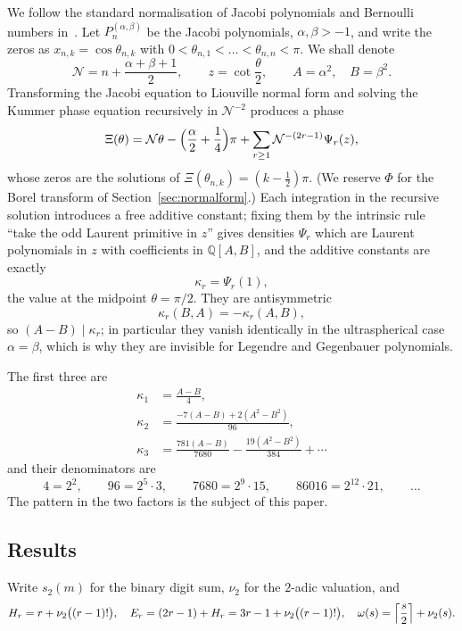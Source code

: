 \documentclass[12pt]{amsart}
\theoremstyle{definition}
\theoremstyle{remark}
\newcommand{\Nn}{\mathcal N}
\begin{document}
We follow the standard normalisation of Jacobi polynomials and Bernoulli numbers in~\cite{Szego,DLMF}.  Let $P_n^{(\alpha,\beta)}$ be the Jacobi polynomials, $\alpha,\beta>-1$, and write the zeros as $x_{n,k}=\cos\theta_{n,k}$ with $0<\theta_{n,1}<\dots<\theta_{n,n}<\pi$. We shall denote
\[
  \Nn=n+\frac{\alpha+\beta+1}2,\qquad z=\cot\frac\theta2,\qquad   A=\alpha^2,\quad B=\beta^2 .
\]
Transforming the Jacobi equation to Liouville normal form and solving the Kummer phase equation recursively in $\Nn^{-2}$ produces a phase
\begin{equation}\label{eq:phase}
  \Xi(\theta)=\Nn\theta-\Bigl(\frac\alpha2+\frac14\Bigr)\pi   +\sum_{r\ge1}\Nn^{-(2r-1)}\Psi_r(z),
\end{equation}
whose zeros are the solutions of $\Xi(\theta_{n,k})=(k-\frac12)\pi$.  (We reserve $\Phi$ for the Borel transform of Section~\ref{sec:normalform}.)  Each integration in the recursive solution introduces a free additive constant; fixing them by the intrinsic rule ``take the odd Laurent primitive in $z$'' gives densities $\Psi_r$ which are Laurent polynomials in $z$ with coefficients in $\mathbb Q[A,B]$, and the additive constants are exactly
\[
  \kappa_r=\Psi_r(1),
\]
the value at the midpoint $\theta=\pi/2$.  They are antisymmetric
\[
\kappa_r(B,A)=-\kappa_r(A,B), 
\]
so $(A-B)\mid\kappa_r$; in particular they vanish identically in the ultraspherical case $\alpha=\beta$, which is why they are invisible for Legendre and Gegenbauer polynomials.

The first three are
\begin{align*}
  \kappa_1&=\frac{A-B}4,\\
  \kappa_2&=\frac{-7(A-B)+2(A^2-B^2)}{96},\\
  \kappa_3&=\frac{781(A-B)}{7680}-\frac{19(A^2-B^2)}{384}+\cdots
\end{align*}
and their denominators are
\[
  4=2^2,\qquad 96=2^5\!\cdot\!3,\qquad 7680=2^9\!\cdot\!15,\qquad   86016=2^{12}\!\cdot\!21,\qquad\dots
\]
The pattern in the two factors is the subject of this paper.

\subsection{Results}

Write $s_2(m)$ for the binary digit sum, $\nu_2$ for the $2$-adic valuation,
and
\[
  H_r=r+\nu_2\bigl((r-1)!\bigr),\quad
  E_r=(2r-1)+H_r=3r-1+\nu_2\bigl((r-1)!\bigr),\quad
  \omega(s)=\Bigl\lceil\frac s2\Bigr\rceil+\nu_2(s).
\]
\end{document}
